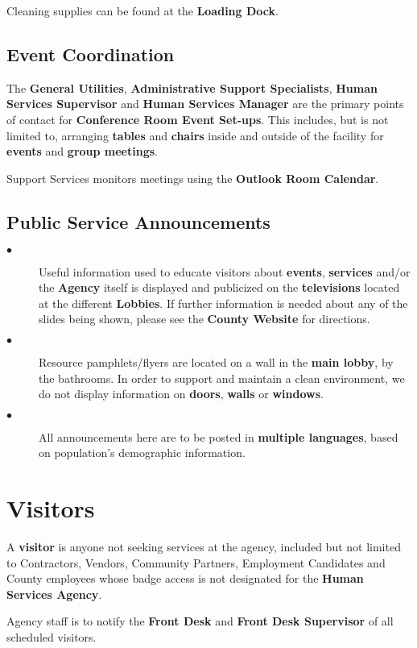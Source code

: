 \documentclass{article}
\begin{document}
Cleaning supplies can be found at the \textbf{Loading Dock}.

\subsection{Event Coordination}
The \textbf{General Utilities}, \textbf{Administrative Support Specialists}, \textbf{Human Services Supervisor} and \textbf{Human Services Manager} are the primary points of contact for \textbf{Conference Room Event Set-ups}. This includes, but is not limited to, arranging \textbf{tables} and \textbf{chairs} inside and outside of the facility for \textbf{events} and \textbf{group meetings}. 

Support Services monitors meetings using the \textbf{Outlook Room Calendar}.

\subsection{Public Service Announcements}
\begin{description}
    \item[$\bullet$] Useful information used to educate visitors about \textbf{events}, \textbf{services} and/or the \textbf{Agency} itself is displayed and publicized on the \textbf{televisions} located at the different \textbf{Lobbies}. If further information is needed about any of the slides being shown, please see the \textbf{County Website} for directions.
    \item[$\bullet$] Resource pamphlets/flyers are located on a wall in the \textbf{main lobby}, by the bathrooms. In order to support and maintain a clean environment, we do not display information on \textbf{doors}, \textbf{walls} or \textbf{windows}. 
    \item[$\bullet$] All announcements here are to be posted in \textbf{multiple languages}, based on population's demographic information.
\end{description}

\section{Visitors}
A \textbf{visitor} is anyone not seeking services at the agency, included but not limited to Contractors, Vendors, Community Partners, Employment Candidates and County employees whose badge access is not designated for the \textbf{Human Services Agency}. 

Agency staff is to notify the \textbf{Front Desk} and \textbf{Front Desk Supervisor} of all scheduled visitors. 
\end{document}
